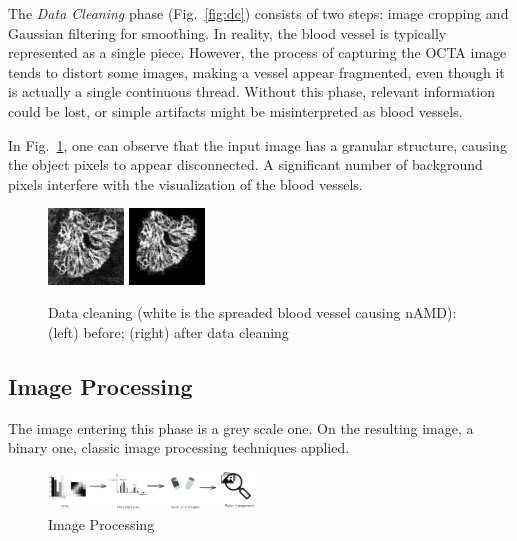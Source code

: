 \documentclass[conference]{IEEEtran}
\begin{document}
The \textit{Data Cleaning} phase (Fig.~\ref{fig:dc}) consists of two steps: image cropping and Gaussian filtering for smoothing. In reality, the blood vessel is typically represented as a single piece. However, the process of capturing the OCTA image tends to distort some images, making a vessel appear fragmented, even though it is actually a single continuous thread. Without this phase, relevant information could be lost, or simple artifacts might be misinterpreted as blood vessels.

In Fig.~\ref{fig:example_clean_1}, one can observe that the input image has a granular structure, causing the object pixels to appear disconnected. A significant number of background pixels interfere with the visualization of the blood vessels.

\begin{figure}%
    \centering
    \includegraphics[width=0.18\textwidth]{fig/nogauss.jpeg}
    \includegraphics[width=0.18\textwidth]{fig/withgauss.jpeg}
    \caption{Data cleaning (white is the spreaded blood vessel causing nAMD): (left) before; (right) after data cleaning}
    \label{fig:example_clean_1}
\end{figure}

\subsection{Image Processing}
The image entering this phase is a grey scale one. On the resulting image, a binary one, classic image processing techniques applied.

\begin{figure}%
    \centering
    \includegraphics[width=0.49\textwidth]{fig/pro3.png}
    \caption{Image Processing}
    \label{fig:pro}
\end{figure}
\end{document}
